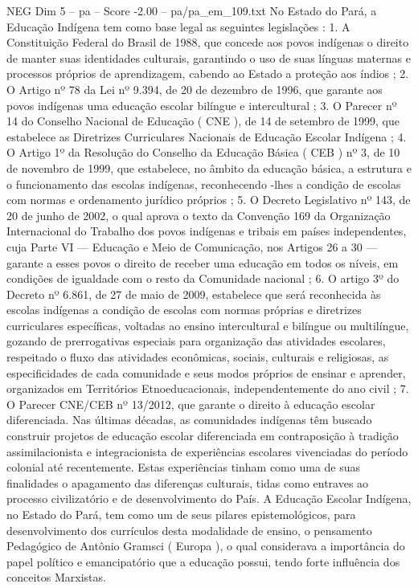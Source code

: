 \begin{textsample}{NEG Dim 5 – pa – Score -2.00 – pa/pa\_em\_109.txt}  \label{ex:f5_neg_044}
No Estado do Pará, a Educação Indígena tem como base legal as seguintes legislações : 1.
A Constituição Federal do Brasil de 1988, que concede aos povos indígenas o direito de manter suas identidades culturais, garantindo o uso de suas línguas maternas e processos próprios de aprendizagem, cabendo ao Estado a proteção aos índios ; 2.
O Artigo nº 78 da Lei nº 9.394, de 20 de dezembro de 1996, que garante aos povos indígenas uma educação escolar bilíngue e intercultural ; 3.
O Parecer nº 14 do Conselho Nacional de Educação ( CNE ), de 14 de setembro de 1999, que estabelece as Diretrizes Curriculares Nacionais de Educação Escolar Indígena ; 4.
O Artigo 1º da Resolução do Conselho da Educação Básica ( CEB ) nº 3, de 10 de novembro de 1999, que estabelece, no âmbito da educação básica, a estrutura e o funcionamento das escolas indígenas, reconhecendo -lhes a condição de escolas com normas e ordenamento jurídico próprios ; 5.
O Decreto Legislativo nº 143, de 20 de junho de 2002, o qual aprova o texto da Convenção 169 da Organização Internacional do Trabalho dos povos indígenas e tribais em países independentes, cuja Parte VI — Educação e Meio de Comunicação, nos Artigos 26 a 30 — garante a esses povos o direito de receber uma educação em todos os níveis, em condições de igualdade com o resto da Comunidade nacional ; 6.
O artigo 3º do Decreto nº 6.861, de 27 de maio de 2009, estabelece que será reconhecida às escolas indígenas a condição de escolas com normas próprias e diretrizes curriculares específicas, voltadas ao ensino intercultural e bilíngue ou multilíngue, gozando de prerrogativas especiais para organização das atividades escolares, respeitado o fluxo das atividades econômicas, sociais, culturais e religiosas, as especificidades de cada comunidade e seus modos próprios de ensinar e aprender, organizados em Territórios Etnoeducacionais, independentemente do ano civil ; 7.
O Parecer CNE/CEB nº 13/2012, que garante o direito à educação escolar diferenciada.
Nas últimas décadas, as comunidades indígenas têm buscado construir projetos de educação escolar diferenciada em contraposição à tradição assimilacionista e integracionista de experiências escolares vivenciadas do período colonial até recentemente.
Estas experiências tinham como uma de suas finalidades o apagamento das diferenças culturais, tidas como entraves ao processo civilizatório e de desenvolvimento do País.
A Educação Escolar Indígena, no Estado do Pará, tem como um de seus pilares epistemológicos, para desenvolvimento dos currículos desta modalidade de ensino, o pensamento Pedagógico de Antônio Gramsci ( Europa ), o qual considerava a importância do papel político e emancipatório que a educação possui, tendo forte influência dos conceitos Marxistas.

\end{textsample}
